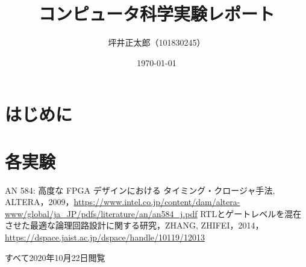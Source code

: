 \documentclass[a4paper,15pt]{jsarticle}
\begin{document}
\title{コンピュータ科学実験レポート}
\author{坪井正太郎（101830245）}
\date{\today}
\maketitle

\section*{はじめに}

\section*{各実験}




\begin{thebibliography}{99}
  AN 584: 高度な FPGA デザインにおける  タイミング・クロージャ手法, ALTERA，2009，\url{https://www.intel.co.jp/content/dam/altera-www/global/ja_JP/pdfs/literature/an/an584_j.pdf}
   RTLとゲートレベルを混在させた最適な論理回路設計に関する研究，ZHANG, ZHIFEI，2014，\url{https://dspace.jaist.ac.jp/dspace/handle/10119/12013}
\end{thebibliography}
すべて2020年10月22日閲覧
\end{document}

